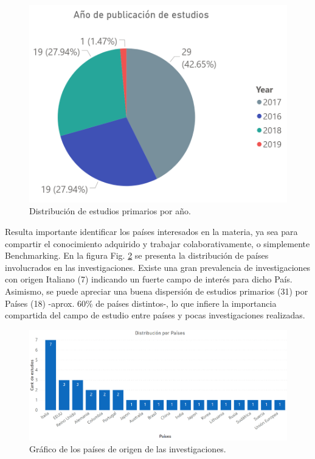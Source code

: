 \begin{figure}[H]
\centering
\includegraphics{TESIS/imagenes/chap03/sintesis_anio.PNG}
\caption{Distribución de estudios primarios por año.}
\label{fig:synthesis_year}
\end{figure}

Resulta importante identificar los países interesados en la materia, ya sea para compartir el conocimiento adquirido y trabajar colaborativamente, o simplemente Benchmarking. En la figura Fig. \ref{fig:synthesis_countries} se presenta la distribución de países involucrados en las investigaciones. Existe una gran prevalencia de investigaciones con origen Italiano (7) indicando un fuerte campo de interés para dicho País. Asimismo, se puede apreciar una buena dispersión de estudios primarios (31) por Países (18) -aprox. 60\% de países distintos-, lo que infiere la importancia compartida del campo de estudio entre países y pocas investigaciones realizadas.    

\begin{figure}[H]
\centering
\includegraphics[width=\textwidth]{TESIS/imagenes/chap03/sintesis_country.PNG}
\caption{Gráfico de los países de origen de las investigaciones.}
\label{fig:synthesis_countries}
\end{figure}

